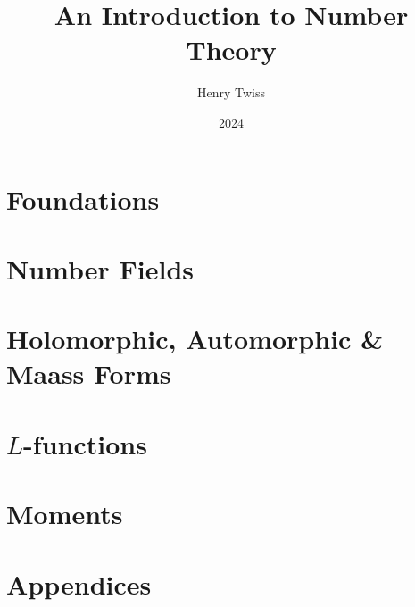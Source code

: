 \documentclass[12pt,oneside]{book}
\title{An Introduction to Number Theory}
\author{Henry Twiss}
\date{2024}
\begin{document}
\maketitle
\pagestyle{empty}
\tableofcontents
\setcounter{page}{0}
\pagestyle{fancy}

\part{Foundations}
  

\part{Number Fields}
  
  
  

\part{Holomorphic, Automorphic \& Maass Forms}
  
  
  
  

\part{\texorpdfstring{$L$}{L}-functions}
  
  
  

\part{Moments}
  
  

\part{Appendices}
  

\printindex


\end{document}
